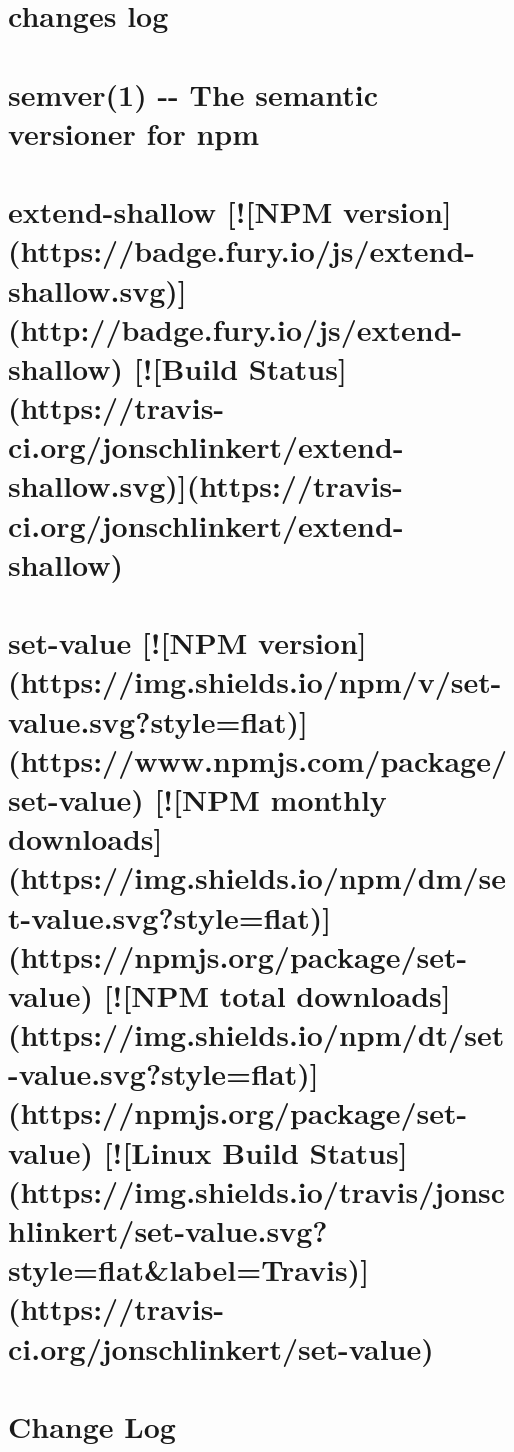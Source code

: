 \documentclass[twoside]{book}
\newcommand{\+}{\discretionary{\mbox{\scriptsize$\hookleftarrow$}}{}{}}
\begin{document}
\chapter{changes log}
\label{md_dsmacc_vis_degree_node_modules_semver_CHANGELOG}

\chapter{semver(1) -\/-\/ The semantic versioner for npm}
\label{md_dsmacc_vis_degree_node_modules_semver_README}

\chapter{extend-\/shallow \mbox{[}!\mbox{[}N\+PM version\mbox{]}(https\+://badge.fury.\+io/js/extend-\/shallow.svg)\mbox{]}(http\+://badge.fury.\+io/js/extend-\/shallow) \mbox{[}!\mbox{[}Build Status\mbox{]}(https\+://travis-\/ci.org/jonschlinkert/extend-\/shallow.svg)\mbox{]}(https\+://travis-\/ci.org/jonschlinkert/extend-\/shallow)}
\label{md_dsmacc_vis_degree_node_modules_set-value_node_modules_extend-shallow_README}

\chapter{set-\/value \mbox{[}!\mbox{[}N\+PM version\mbox{]}(https\+://img.shields.\+io/npm/v/set-\/value.svg?style=flat)\mbox{]}(https\+://www.npmjs.\+com/package/set-\/value) \mbox{[}!\mbox{[}N\+PM monthly downloads\mbox{]}(https\+://img.shields.\+io/npm/dm/set-\/value.svg?style=flat)\mbox{]}(https\+://npmjs.org/package/set-\/value) \mbox{[}!\mbox{[}N\+PM total downloads\mbox{]}(https\+://img.shields.\+io/npm/dt/set-\/value.svg?style=flat)\mbox{]}(https\+://npmjs.org/package/set-\/value) \mbox{[}!\mbox{[}Linux Build Status\mbox{]}(https\+://img.shields.\+io/travis/jonschlinkert/set-\/value.svg?style=flat\&label=Travis)\mbox{]}(https\+://travis-\/ci.org/jonschlinkert/set-\/value)}
\label{md_dsmacc_vis_degree_node_modules_set-value_README}

\chapter{Change Log}
\label{md_dsmacc_vis_degree_node_modules_signal-exit_CHANGELOG}

\end{document}
